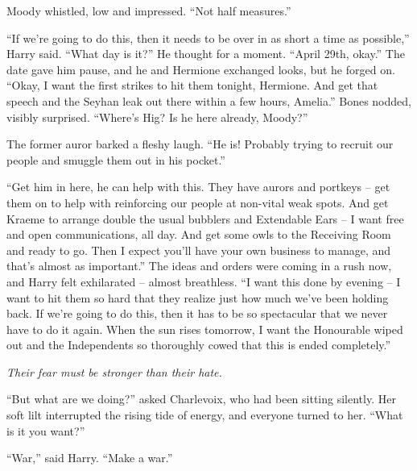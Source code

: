 Moody whistled, low and impressed. ``Not half measures.''

``If we're going to do this, then it needs to be over in as short a time
as possible,'' Harry said. ``What day is it?'' He thought for a moment.
``April 29th, okay.'' The date gave him pause, and he and Hermione
exchanged looks, but he forged on. ``Okay, I want the first strikes to
hit them tonight, Hermione. And get that speech and the Seyhan leak out
there within a few hours, Amelia.'' Bones nodded, visibly surprised.
``Where's Hig? Is he here already, Moody?''

The former auror barked a fleshy laugh. ``He is! Probably trying to
recruit our people and smuggle them out in his pocket.''

``Get him in here, he can help with this. They have aurors and portkeys
-- get them on to help with reinforcing our people at non-vital weak
spots. And get Kraeme to arrange double the usual bubblers and
Extendable Ears -- I want free and open communications, all day. And get
some owls to the Receiving Room and ready to go. Then I expect you'll
have your own business to manage, and that's almost as important.'' The
ideas and orders were coming in a rush now, and Harry felt exhilarated
-- almost breathless. ``I want this done by evening -- I want to hit
them so hard that they realize just how much we've been holding back. If
we're going to do this, then it has to be so spectacular that we never
have to do it again. When the sun rises tomorrow, I want the Honourable
wiped out and the Independents so thoroughly cowed that this is ended
completely.''

\emph{Their fear must be stronger than their hate.}

``But what are we doing?'' asked Charlevoix, who had been sitting
silently. Her soft lilt interrupted the rising tide of energy, and
everyone turned to her. ``What is it you want?''

``War,'' said Harry. ``Make a war.''
